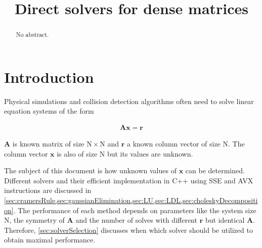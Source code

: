 \documentclass[fontsize = 10pt,DIV = 13]{scrartcl}
\title{Direct solvers for dense matrices}
\begin{document}
\maketitle

\begin{abstract}
No abstract.
\end{abstract}
\newpage
\tableofcontents
\newpage

\section{Introduction}

Physical simulations and collision detection algorithms often need to solve linear equation systems of the form

\begin{align}
\label{eq:linearSystem}
\mathbf{A}\mathbf{x}=\mathbf{r}
\end{align}

$\mathbf{A}$ is known matrix of size $\mathrm{N}\times\mathrm{N}$ and $\mathbf{r}$ a known column vector of size $\mathrm{N}$.
The column vector $\mathbf{x}$ is also of size $\mathrm{N}$ but its values are unknown.

 


The subject of this document is how  unknown values of $\mathbf{x}$ can be determined. 
Different solvers and their efficient implementation in C++ using SSE and AVX instructions are discussed in \cref{sec:cramersRule,sec:gaussianElimination,sec:LU,sec:LDL,sec:choleskyDecomposition}.
The performance of each method depends on parameters like the system size $\mathrm{N}$, the symmetry of $\mathbf{A}$ and the number of solves with different $\mathbf{r}$ but identical $\mathbf{A}$.
Therefore, \cref{sec:solverSelection} discusses when which solver should be utilized to obtain maximal performance.
\end{document}
